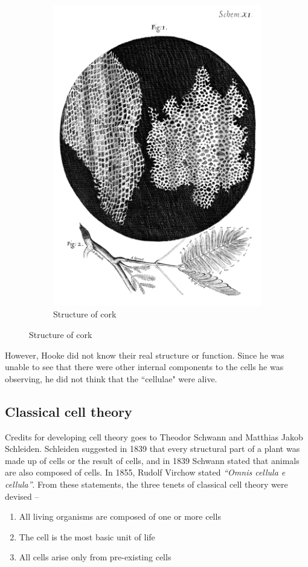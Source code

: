 \documentclass[12pt, a4paper, titlepage]{article}
\begin{document}
\begin{figure}[H]
\begin{subfigure}{0.45\textwidth}
        \includegraphics[scale=0.15]{img/hooke-draw.png}
        \caption{Structure of cork}
    \end{subfigure}
\end{figure}

However, Hooke did not know their real structure or function. Since he was unable to see that there were other internal components to the cells he was observing, he did not think that the ``cellulae" were alive.\supercite{gest2004}

\subsection{Classical cell theory}
Credits for developing cell theory goes to Theodor Schwann and Matthias Jakob Schleiden.\supercite{sharp1921} Schleiden suggested in 1839 that every structural part of a plant was made up of cells or the result of cells, \supercite{schleiden1838} and in 1839 Schwann stated that animals are also composed of cells.\supercite{schwann1839} In 1855, Rudolf Virchow stated \textit{``Omnis cellula e cellula''}.\supercite{robinson} From these statements, the three tenets of classical cell theory were devised --

\begin{enumerate}[noitemsep,parsep=0.2em,leftmargin=4em,topsep=\parskip]
    \item All living organisms are composed of one or more cells
    \item The cell is the most basic unit of life
    \item All cells arise only from pre-existing cells
\end{enumerate}


\newpage
\printbibliography
\end{document}

